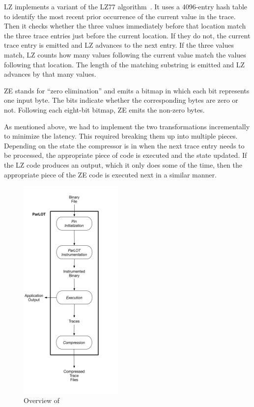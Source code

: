 LZ implements a variant of the LZ77 algorithm~\cite{LZ}. It uses a 4096-entry hash table to identify the most recent prior occurrence of the current value in the trace. Then it checks whether the three values immediately before that location match the three trace entries just before the current location. If they do not, the current trace entry is emitted and LZ advances to the next entry. If the three values match, LZ counts how many values following the current value match the values following that location. The length of the matching substring is emitted and LZ advances by that many values.

ZE stands for ``zero elimination'' and emits a bitmap in which each bit represents one input byte. The bits indicate whether the corresponding bytes are zero or not. Following each eight-bit bitmap, ZE emits the non-zero bytes.

As mentioned above, we had to implement the two transformations incrementally to minimize the latency. This required breaking them up into multiple pieces. Depending on the state the compressor is in when the next trace entry needs to be processed, the appropriate piece of code is executed and the state updated. If the LZ code produces an output, which it only does some of the time, then the appropriate piece of the ZE code is executed next in a similar manner.


\begin{figure}[!t]
\centering
\includegraphics[width=2in]{overview.png}
\caption{Overview of \parlot}
\label{overview}
\end{figure}


